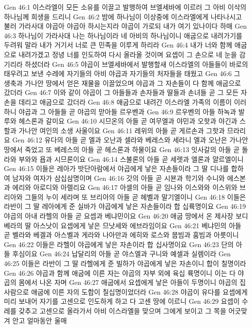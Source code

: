 Gen 46:1  이스라엘이 모든 소유를 이끌고 발행하여 브엘세바에 이르러 그 아비 이삭의 하나님께 희생을 드리니
Gen 46:2  밤에 하나님이 이상중에 이스라엘에게 나타나시고 불러 가라사대 야곱아 야곱아 하시는지라 야곱이 가로되 내가 여기 있나이다 하매
Gen 46:3  하나님이 가라사대 나는 하나님이라 네 아비의 하나님이니 애굽으로 내려가기를 두려워 말라 내가 거기서 너로 큰 민족을 이루게 하리라
Gen 46:4  내가 너와 함께 애굽으로 내려가겠고 정녕 너를 인도하여 다시 올라올 것이며 요셉이 그 손으로 네 눈을 감기리라 하셨더라
Gen 46:5  야곱이 브엘세바에서 발행할새 이스라엘의 아들들이 바로의 태우려고 보낸 수레에 자기들의 아비 야곱과 자기들의 처자들을 태웠고
Gen 46:6  그 생축과 가나안 땅에서 얻은 재물을 이끌었으며 야곱과 그 자손들이 다 함께 애굽으로 갔더라
Gen 46:7  이와 같이 야곱이 그 아들들과 손자들과 딸들과 손녀들 곧 그 모든 자손을 데리고 애굽으로 갔더라
Gen 46:8  애굽으로 내려간 이스라엘 가족의 이름이 이러하니 야곱과 그 아들들 곧 야곱의 맏아들 르우벤과
Gen 46:9  르우벤의 아들 하녹과 발루와 헤스론과 갈미요
Gen 46:10  시므온의 아들 곧 여무엘과 야민과 오핫과 야긴과 스할과 가나안 여인의 소생 사울이요
Gen 46:11  레위의 아들 곧 게르손과 그핫과 므라리요
Gen 46:12  유다의 아들 곧 엘과 오난과 셀라와 베레스와 세라니 엘과 오난은 가나안 땅에서 죽었고 또 베레스의 아들 곧 헤스론과 하물이요
Gen 46:13  잇사갈의 아들 곧 돌라와 부와와 욥과 시므론이요
Gen 46:14  스불론의 아들 곧 세렛과 엘론과 얄르엘이니
Gen 46:15  이들은 레아가 밧단아람에서 야곱에게 낳은 자손들이라 그 딸 디나를 합하여 남자와 여자가 삼십삼명이며
Gen 46:16  갓의 아들 곧 시뵨과 학기와 수니와 에스본과 에리와 아로디와 아렐리요
Gen 46:17  아셀의 아들 곧 임나와 이스와와 이스위와 브리아와 그들의 누이 세라며 또 브리아의 아들 곧 헤벨과 말기엘이니
Gen 46:18  이들은 라반이 그 딸 레아에게 준 실바가 야곱에게 낳은 자손들이라 합 십륙명이요
Gen 46:19  야곱의 아내 라헬의 아들 곧 요셉과 베냐민이요
Gen 46:20  애굽 땅에서 온 제사장 보디베라의 딸 아스낫이 요셉에게 낳은 므낫세와 에브라임이요
Gen 46:21  베냐민의 아들 곧 벨라와 베겔과 아스벨과 게라와 나아만과 에히와 로스와 뭅빔과 훔빔과 아릇이니
Gen 46:22  이들은 라헬이 야곱에게 낳은 자손이라 합 십사명이요
Gen 46:23  단의 아들 후심이요
Gen 46:24  납달리의 아들 곧 야스엘과 구니와 예셀과 실렘이라
Gen 46:25  이들은 라반이 그 딸 라헬에게 준 빌하가 야곱에게 낳은 자손이니 합이 칠명이라
Gen 46:26  야곱과 함께 애굽에 이른 자는 야곱의 자부 외에 육십 륙명이니 이는 다 야곱의 몸에서 나온 자며
Gen 46:27  애굽에서 요셉에게 낳은 아들이 두명이니 야곱의 집 사람으로 애굽에 이른 자의 도합이 칠십명이었더라
Gen 46:28  야곱이 유다를 요셉에게 미리 보내어 자기를 고센으로 인도하게 하고 다 고센 땅에 이르니
Gen 46:29  요셉이 수레를 갖추고 고센으로 올라가서 아비 이스라엘을 맞으며 그에게 보이고 그 목을 어긋맞겨 안고 얼마동안 울매
